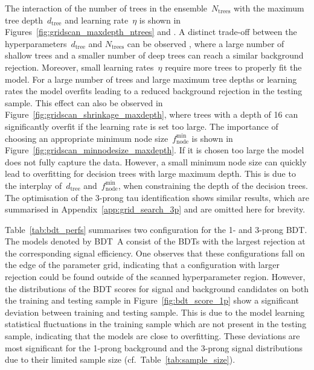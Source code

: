The interaction of the number of trees in the ensemble~$N_\text{trees}$ with the
maximum tree depth~$d_\text{tree}$ and learning rate~$\eta$ is shown in
Figures~\ref{fig:gridscan_maxdepth_ntrees} and
. A distinct trade-off between the
hyperparameters~$d_\text{tree}$ and $N_\text{trees}$ can be observed , where a
large number of shallow trees and a smaller number of deep trees can reach a
similar background rejection. Moreover, small learning rates~$\eta$ require more
trees to properly fit the model. For a large number of trees and large maximum
tree depths or learning rates the model overfits leading to a reduced background
rejection in the testing sample. This effect can also be observed in
Figure~\ref{fig:gridscan_shrinkage_maxdepth}, where trees with a depth of 16 can
significantly overfit if the learning rate is set too large. The importance of
choosing an appropriate minimum node size~$f_\text{node}^\text{min}$ is shown in
Figure~\ref{fig:gridscan_minnodesize_maxdepth}. If it is chosen too large the
model does not fully capture the data. However, a small minimum node size can
quickly lead to overfitting for decision trees with large maximum depth. This is
due to the interplay of~$d_\text{tree}$ and~$f_\text{node}^\text{min}$, when
constraining the depth of the decision trees. The optimisation of the 3-prong
tau identification shows similar results, which are summarised in
Appendix~\ref{app:grid_search_3p} and are omitted here for brevity.

Table~\ref{tab:bdt_perfs} summarises two configuration for the 1- and 3-prong
BDT. The models denoted by \mbox{BDT A} consist of the BDTs with the largest
rejection at the corresponding signal efficiency. One observes that these
configurations fall on the edge of the parameter grid, indicating that a
configuration with larger rejection could be found outside of the scanned
hyperparameter region. However, the distributions of the BDT scores for signal
and background \tauhadvis candidates on both the training and testing sample in
Figure~\ref{fig:bdt_score_1p} show a significant deviation between training and
testing sample. This is due to the model learning statistical fluctuations in
the training sample which are not present in the testing sample, indicating that
the models are close to overfitting. These deviations are most significant for
the 1-prong background and the 3-prong signal distributions due to their limited
sample size (cf.\ Table~\ref{tab:sample_size}).


